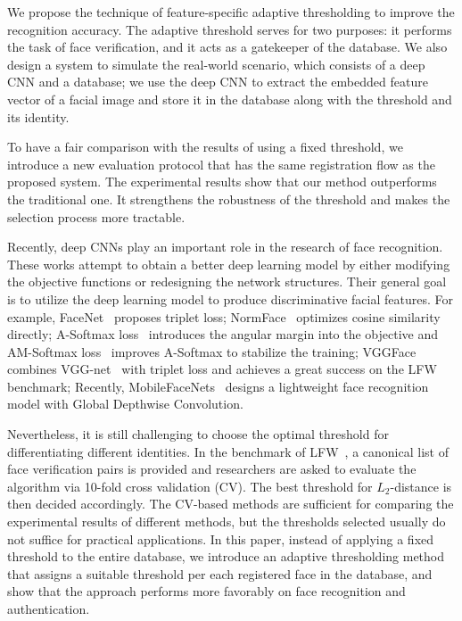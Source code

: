 \documentclass[10pt,twocolumn]{article}
\begin{document}
We propose the technique of feature-specific adaptive thresholding to improve the recognition accuracy. The adaptive threshold serves for two purposes: it performs the task of face verification, and it acts as a gatekeeper of the database. We also design a system to simulate the real-world scenario, which consists of a deep CNN and a database; we use the deep CNN to extract the embedded feature vector of a facial image and store it in the database along with the threshold and its identity.

To have a fair comparison with the results of using a fixed threshold, we introduce a new evaluation protocol that has the same registration flow as the proposed system. The experimental results show that our method outperforms the traditional one. It strengthens the robustness of the threshold and makes the selection process more tractable.

Recently, deep CNNs play an important role in the research of face recognition. These works attempt to obtain a better deep learning model by either modifying the objective functions or redesigning the network structures. Their general goal is to utilize the deep learning model to produce discriminative facial features.
For example, FaceNet~\cite{schroff2015facenet} proposes triplet loss; NormFace~\cite{wang2017normface} optimizes cosine similarity directly; A-Softmax loss~\cite{liu2017sphereface} introduces the angular margin into the objective and AM-Softmax loss~\cite{wang2018additive} improves A-Softmax to stabilize the training; VGGFace\cite{parkhi2015deep} combines VGG-net~\cite{simonyan2014very} with triplet loss and achieves a great success on the LFW benchmark; Recently, MobileFaceNets~\cite{chen2018mobilefacenets} designs a lightweight face recognition model with Global Depthwise Convolution.


Nevertheless, it is still challenging to choose the optimal threshold for differentiating different identities. In the benchmark of LFW~\cite{huang2008labeled}, a canonical list of face verification pairs is provided and researchers are asked to evaluate the algorithm via 10-fold cross validation (CV). The best threshold for $L_2$-distance is then decided accordingly. The CV-based methods are sufficient for comparing the experimental results of different methods, but the thresholds selected usually do not suffice for practical applications.
In this paper, instead of applying a fixed threshold to the entire database, we introduce an adaptive thresholding method that assigns a suitable threshold per each registered face in the database, and show that the approach performs more favorably on face recognition and authentication.
\end{document}
